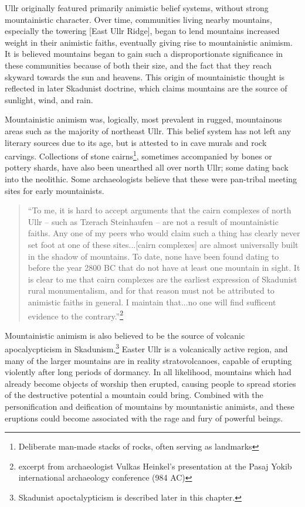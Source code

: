 Ullr originally featured primarily animistic belief systems, without strong mountainistic character. Over time, communities living nearby mountains, especially the towering [East Ullr Ridge], began to lend mountains increased weight in their animistic faiths, eventually giving rise to mountainistic animism. It is believed mountains began to gain such a disproportionate significance in these communities because of both their size, and the fact that they reach skyward towards the sun and heavens. This origin of mountainistic thought is reflected in later Skadunist doctrine, which claims mountains are the source of sunlight, wind, and rain.\par

Mountainistic animism was, logically, most prevalent in rugged, mountainous areas such as the majority of northeast Ullr. This belief system has not left any literary sources due to its age, but is attested to in cave murals and rock carvings. Collections of stone cairns\footnote{Deliberate man-made stacks of rocks, often serving as landmarks}, sometimes accompanied by bones or pottery shards, have also been unearthed all over north Ullr; some dating back into the neolithic. Some archaeologists believe that these were pan-tribal meeting sites for early mountainists. \par
\begin{quote}
``To me, it is hard to accept arguments that the cairn complexes of north Ullr -- such as Tzerach Steinhaufen -- are not a result of mountainistic faiths. Any one of my peers who would claim such a thing has clearly never set foot at one of these sites...[cairn complexes] are almost universally built in the shadow of mountains. To date, none have been found dating to before the year 2800 BC that do not have at least one mountain in sight. It is clear to me that cairn complexes are the earliest expression of Skadunist rural monumentalism, and for that reason must not be attributed to animistic faiths in general. I maintain that...no one will find sufficent evidence to the contrary.''\footnote{excerpt from archaeologist Vulkas Heinkel's presentation at the Pasaj Yokib international archaeology conference (984 AC)}
\end{quote}

Mountainistic animism is also believed to be the source of volcanic apocalycpticism in Skadunism.\footnote{Skadunist apoctalypticism is described later in this chapter.} Easter Ullr is a volcanically active region, and many of the larger mountains are in reality stratovolcanoes, capable of erupting violently after long periods of dormancy. In all likelihood, mountains which had already become objects of worship then erupted, causing people to spread stories of the  destructive potential a mountain could bring. Combined with the personification and deification of mountains by mountanistic animists, and these eruptions could become associated with the rage and fury of powerful beings.

